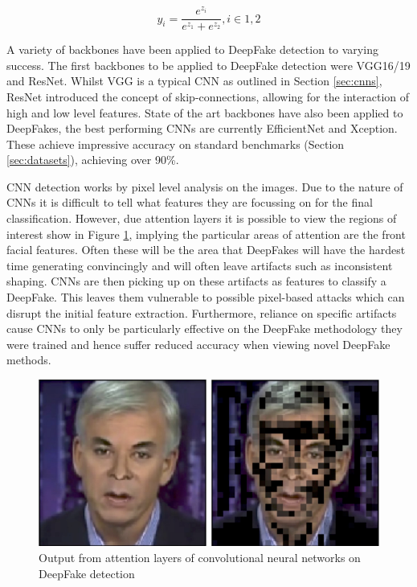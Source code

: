 \begin{equation}
    \label{eq:softmax}
    y_i=\frac{e^{z_i}}{e^{z_1} + e^{z_2}}, i\in1,2
\end{equation}

A variety of backbones have been applied to DeepFake detection to varying success\cite{thing2023deepfake}. The first backbones to be applied to DeepFake detection were VGG16/19\cite{simonyan2014very} and ResNet\cite{he2016deep}. Whilst VGG is a typical CNN as outlined in Section \ref{sec:cnns}, ResNet introduced the concept of skip-connections, allowing for the interaction of high and low level features. State of the art backbones have also been applied to DeepFakes, the best performing CNNs are currently EfficientNet\cite{tan2019efficientnet} and Xception\cite{chollet2017xception}. These achieve impressive accuracy on standard benchmarks (Section \ref{sec:datasets}), achieving over 90\%.

CNN detection works by pixel level analysis on the images. Due to the nature of CNNs it is difficult to tell what features they are focussing on for the final classification. However, due attention layers it is possible to view the regions of interest show in Figure \ref{fig:attention}, implying the particular areas of attention are the front facial features. Often these will be the area that DeepFakes will have the hardest time generating convincingly and will often leave artifacts such as inconsistent shaping\cite{verdoliva2020media}. CNNs are then picking up on these artifacts as features to classify a DeepFake. This leaves them vulnerable to possible pixel-based attacks which can disrupt the initial feature extraction\cite{gandhi2020adversarial}. Furthermore, reliance on specific artifacts cause CNNs to only be particularly effective on the DeepFake methodology they were trained and hence suffer reduced accuracy when viewing novel DeepFake methods\cite{thing2023deepfake}.

\begin{figure}[H]
    \centering
    \includegraphics[width=0.5\linewidth]{dissertation//figures/attention-cnns.png}
    \caption{Output from attention layers of convolutional neural networks on DeepFake detection}
    \label{fig:attention}
\end{figure}

